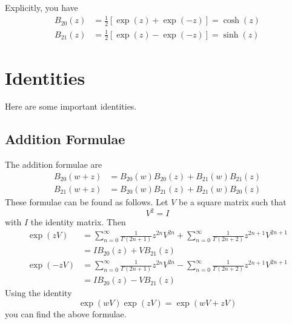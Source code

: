 Explicitly, you have
\begin{align}
    B_{20}(z) &= \frac{1}{2} \left[ \exp(z) + \exp(-z) \right] = \cosh(z) \\
    B_{21}(z) &= \frac{1}{2} \left[ \exp(z) - \exp(-z) \right] = \sinh(z)
\end{align}
\section{Identities}
Here are some important identities.
\subsection{Addition Formulae}
The addition formulae are
\begin{align}
    B_{20}(w + z) &= B_{20}(w) B_{20}(z) + B_{21}(w) B_{21}(z) \\
    B_{21}(w + z) &= B_{20}(w) B_{21}(z) + B_{21}(w) B_{20}(z)
\end{align}
These formulae can be found as follows. Let $V$ be a square matrix such that
\begin{equation}
    V^{2} = I
\end{equation}
with $I$ the identity matrix. Then
\begin{align}
    \exp\left( z V \right) &= \sum_{n = 0}^{\infty} \frac{1}{\Gamma(2n + 1)} z^{2n} V^{2n} + \sum_{n = 0}^{\infty} \frac{1}{\Gamma(2n + 2)} z^{2n+1} V^{2n+1} \\ &= I B_{20}(z) + V B_{21}(z) \\
    \exp\left( -z V \right) &= \sum_{n = 0}^{\infty} \frac{1}{\Gamma(2n + 1)} z^{2n} V^{2n} - \sum_{n = 0}^{\infty} \frac{1}{\Gamma(2n + 2)} z^{2n+1} V^{2n+1} \\ &= I B_{20}(z) - V B_{21}(z)
\end{align}
Using the identity
\begin{equation}
    \exp\left( w V \right) \exp\left( z V \right) = \exp\left( wV + zV \right)
\end{equation}
you can find the above formulae.
